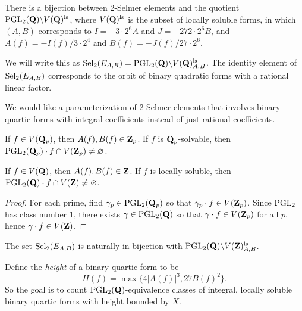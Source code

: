 \begin{theo}
There is a bijection between 2-Selmer elements and the quotient 
$\operatorname{PGL}_2(\mathbf{Q})\backslash V(\mathbf{Q})^\mathrm{ls}$, where 
$V(\mathbf{Q})^\mathrm{ls}$ is the subset of locally soluble forms, in which 
$(A,B)$ corresponds to $I=-3\cdot 2^6 A$ and $J=-272\cdot 2^6 B$, and 
$A(f)=-I(f)/3\cdot 2^4$ and $B(f) = -J(f)/27\cdot 2^6$. 
\end{theo}

We will write this as 
$\operatorname{Sel}_2(E_{A,B}) = \operatorname{PGL}_2(\mathbf{Q})\backslash V(\mathbf{Q})_{A,B}^\mathrm{ls}$. 
The identity element of $\operatorname{Sel}_2(E_{A,B})$ corresponds to the orbit of 
binary quadratic forms with a rational linear factor. 

We would like a parameterization of 2-Selmer elements that involves binary 
quartic forms with integral coefficients instead of just rational coefficients. 

\begin{lemm}
If $f\in V(\mathbf{Q}_p)$, then $A(f),B(f)\in \mathbf{Z}_p$. If $f$ is $\mathbf{Q}_p$-solvable, then 
$\operatorname{PGL}_2(\mathbf{Q}_p)\cdot f\cap V(\mathbf{Z}_p)\ne\varnothing$. 
\end{lemm}

\begin{theo}
If $f\in V(\mathbf{Q})$, then $A(f),B(f)\in \mathbf{Z}$. If $f$ is locally soluble, then 
$\operatorname{PGL}_2(\mathbf{Q})\cdot f\cap V(\mathbf{Z})\ne\varnothing$. 
\end{theo}
\begin{proof}
For each prime, find $\gamma_p\in\operatorname{PGL}_2(\mathbf{Q}_p)$ so that 
$\gamma_p\cdot f\in V(\mathbf{Z}_p)$. Since $\operatorname{PGL}_2$ has class 
number $1$, there exists $\gamma\in \operatorname{PGL}_2(\mathbf{Q})$ so that 
$\gamma\cdot f\in V(\mathbf{Z}_p)$ for all $p$, hence $\gamma\cdot f\in V(\mathbf{Z})$. 
\end{proof}

\begin{theo}
The set $\operatorname{Sel}_2(E_{A,B})$ is naturally in bijection with 
$\operatorname{PGL}_2(\mathbf{Q}) \backslash V(\mathbf{Z})_{A,B}^\mathrm{ls}$. 
\end{theo}

Define the \emph{height} of a binary quartic form to be 
\[
  H(f) = \max\{4|A(f)|^3, 27 B(f)^2\} .
\]
So the goal is to count $\operatorname{PGL}_2(\mathbf{Q})$-equivalence classes 
of integral, locally soluble binary quartic forms with height bounded by $X$. 





